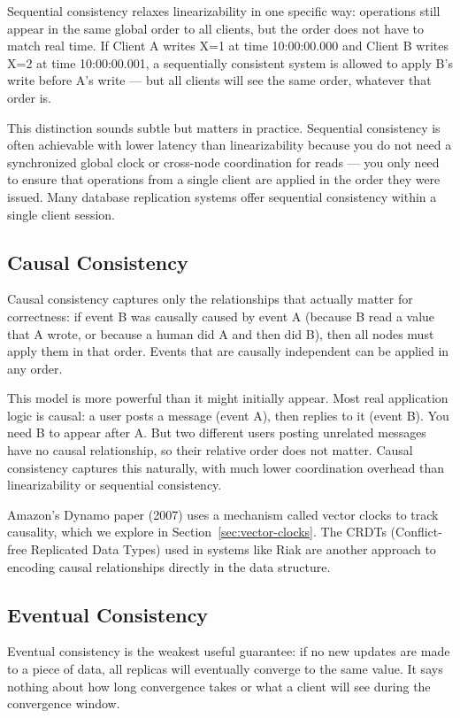 \documentclass[11pt,a4paper]{article}
\begin{document}
Sequential consistency relaxes linearizability in one specific way: operations still appear in the same global order to all clients, but the order does not have to match real time. If Client A writes X=1 at time 10:00:00.000 and Client B writes X=2 at time 10:00:00.001, a sequentially consistent system is allowed to apply B's write before A's write --- but all clients will see the same order, whatever that order is.

This distinction sounds subtle but matters in practice. Sequential consistency is often achievable with lower latency than linearizability because you do not need a synchronized global clock or cross-node coordination for reads --- you only need to ensure that operations from a single client are applied in the order they were issued. Many database replication systems offer sequential consistency within a single client session.

\subsection{Causal Consistency}

Causal consistency captures only the relationships that actually matter for correctness: if event B was causally caused by event A (because B read a value that A wrote, or because a human did A and then did B), then all nodes must apply them in that order. Events that are causally independent can be applied in any order.

This model is more powerful than it might initially appear. Most real application logic is causal: a user posts a message (event A), then replies to it (event B). You need B to appear after A. But two different users posting unrelated messages have no causal relationship, so their relative order does not matter. Causal consistency captures this naturally, with much lower coordination overhead than linearizability or sequential consistency.

Amazon's Dynamo paper (2007) uses a mechanism called vector clocks to track causality, which we explore in Section~\ref{sec:vector-clocks}. The CRDTs (Conflict-free Replicated Data Types) used in systems like Riak are another approach to encoding causal relationships directly in the data structure.

\subsection{Eventual Consistency}

Eventual consistency is the weakest useful guarantee: if no new updates are made to a piece of data, all replicas will eventually converge to the same value. It says nothing about how long convergence takes or what a client will see during the convergence window.
\end{document}
